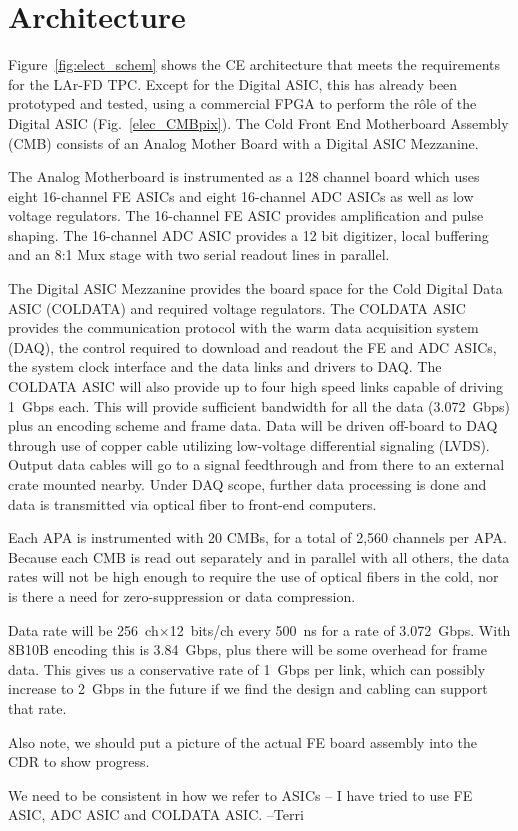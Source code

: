 %
\section{Architecture}
\label{sec:fe-arch}

Figure~\ref{fig:elect_schem} shows the CE architecture that meets the requirements for the LAr-FD TPC.
Except for the Digital ASIC, this has already been prototyped and tested,
using a commercial FPGA to perform the r\^ole of the Digital ASIC (Fig.~\ref{elec_CMBpix}).
The Cold Front End Motherboard Assembly (CMB) consists of an Analog Mother Board with a Digital ASIC Mezzanine.  

The Analog Motherboard is instrumented as a 128 channel board which uses eight 16-channel FE ASICs and
eight 16-channel ADC ASICs as well as low voltage regulators.
The 16-channel FE ASIC provides amplification and pulse shaping.
The 16-channel ADC ASIC provides a 12 bit digitizer, local buffering and an 8:1 Mux stage with two serial readout lines in parallel.

The Digital ASIC Mezzanine provides the board space for the Cold Digital Data ASIC (COLDATA) and required voltage regulators.
The COLDATA ASIC provides the communication protocol with the warm data acquisition system (DAQ),
the control required to download and readout the FE and ADC ASICs,
the system clock interface and the data links and drivers to DAQ.
The COLDATA ASIC will also provide up to four high speed links capable of driving 1~Gbps each.
This will provide sufficient bandwidth for all the data (3.072~Gbps) plus an encoding scheme and frame data.
Data will be driven off-board to DAQ through use of copper cable utilizing low-voltage differential signaling (LVDS).
Output data cables will go to a signal feedthrough and from there to an external crate mounted nearby.
Under DAQ scope, further data processing is done and data is transmitted via optical fiber to front-end computers.

Each APA is instrumented with 20 CMBs, for a total of 2,560 channels per APA.
Because each CMB is read out separately and in parallel with all others,
the data rates will not be high enough to require the use of optical fibers in the cold,
nor is there a need for zero-suppression or data compression.

\begin{editornote}
  Data rate will be 256~ch$\times$12~bits/ch every 500~ns for a rate of 3.072~Gbps.
  With 8B10B encoding this is 3.84~Gbps, plus there will be some overhead for frame data.
  This gives us a conservative rate of 1~Gbps per link, which can possibly increase to 2~Gbps
  in the future if we find the design and cabling can support that rate.

  Also note, we should put a picture of the actual FE board assembly into the CDR to show progress.

  We need to be consistent in how we refer to ASICs -- I have tried to use FE ASIC, ADC ASIC and COLDATA ASIC.
  --Terri
\end{editornote}

